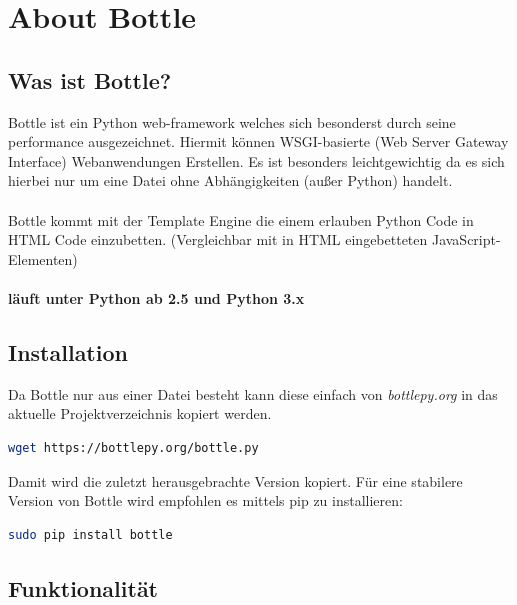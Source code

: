 \clearpage
\section{About Bottle}
\subsection{Was ist Bottle?}
Bottle ist ein Python web-framework welches sich besonderst durch seine performance ausgezeichnet. Hiermit können WSGI-basierte (Web Server Gateway Interface) Webanwendungen Erstellen. Es ist besonders leichtgewichtig da es sich hierbei nur um eine Datei ohne Abhängigkeiten (außer Python) handelt.\\~\\
Bottle kommt mit der Template Engine die einem erlauben Python Code in HTML Code einzubetten. (Vergleichbar mit in HTML eingebetteten JavaScript-Elementen)\\~\\
\textbf{läuft unter Python ab 2.5 und Python 3.x}
\subsection{Installation}
Da Bottle nur aus einer Datei besteht kann diese einfach von \textit{bottlepy.org} in das aktuelle Projektverzeichnis kopiert werden.
\begin{lstlisting}[language=bash]
	wget https://bottlepy.org/bottle.py
\end{lstlisting} 
Damit wird die zuletzt herausgebrachte Version kopiert. Für eine stabilere Version von Bottle wird empfohlen es mittels pip zu installieren:
\begin{lstlisting}[language=bash]
	sudo pip install bottle
\end{lstlisting} 
\subsection{Funktionalität}

